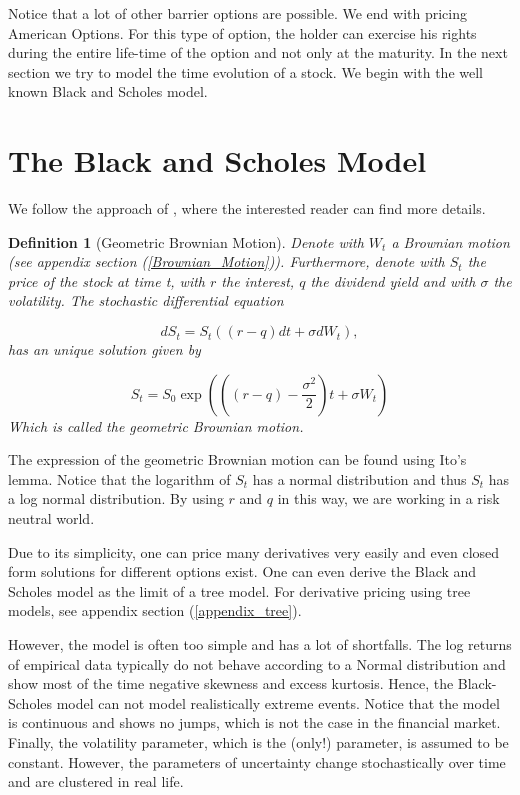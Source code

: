 \documentclass[12pt,a4paper,oneside]{book}
\newtheorem{Definition}{Definition}
\begin{document}
Notice that a lot of other barrier options are possible. We end with pricing American Options. For this type of option, the holder can exercise his rights during the entire life-time of the option and not only at the maturity. In the next section we try to model the time evolution of a stock. We begin with the well known Black and Scholes model. 

\section{The Black and Scholes Model}

We follow the approach of \cite{wimschoutensvg}, where the interested reader can find more details.  

\begin{Definition}[Geometric Brownian Motion]
Denote with $W_t$ a Brownian motion (see appendix section (\ref{Brownian_Motion})). Furthermore, denote with $S_t$ the price of the stock at time t, with $r$ the interest, $q$ the dividend yield and with $\sigma$ the volatility. The stochastic differential equation 

\begin{equation}
dS_t = S_t ((r-q) dt + \sigma dW_t),
\end{equation}
has an unique solution given by

\begin{equation}
S_t = S_0 \exp \left( \left((r-q) - \dfrac{\sigma^2}{2} \right) t + \sigma W_t \right)
\end{equation}
Which is called the geometric Brownian motion.
\end{Definition}

The expression of the geometric Brownian motion can be found using Ito's lemma. Notice that the logarithm of $S_t$ has a normal distribution and thus $S_t$ has a log normal distribution. By using $r$ and $q$ in this way, we are working in a risk neutral world.

Due to its simplicity, one can price many derivatives very easily and even closed form solutions for different options exist. One can even derive the Black and Scholes model as the limit of a tree model. For derivative pricing using tree models, see appendix section (\ref{appendix_tree}). 

However, the model is often too simple and has a lot of shortfalls. The log returns of empirical data typically do not behave according to a Normal distribution and show most of the time negative skewness and excess kurtosis. Hence, the Black-Scholes model can not model realistically extreme events. Notice that the model is continuous and shows no jumps, which is not the case in the financial market. Finally, the volatility parameter, which is the (only!) parameter, is assumed to be constant. However, the parameters of uncertainty change stochastically over time and are clustered in real life.
\end{document}

